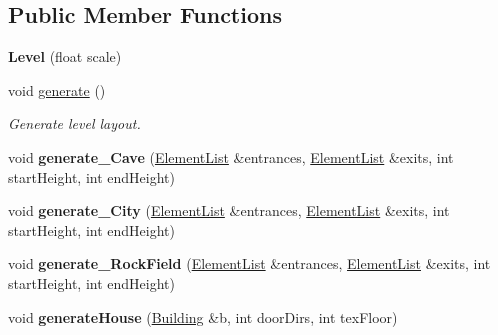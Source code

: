 \subsection*{\-Public \-Member \-Functions}
\begin{DoxyCompactItemize}
\item 
\hypertarget{classLevel_ae153822123767559c1951df8e112ee2b}{
{\bfseries \-Level} (float scale)}
\label{d2/d9d/classLevel_ae153822123767559c1951df8e112ee2b}

\item 
\hypertarget{classLevel_a1c6d2997eb3741c8b22f4a4623eabdc3}{
void \hyperlink{classLevel_a1c6d2997eb3741c8b22f4a4623eabdc3}{generate} ()}
\label{d2/d9d/classLevel_a1c6d2997eb3741c8b22f4a4623eabdc3}

\begin{DoxyCompactList}\small\item\em \-Generate level layout. \end{DoxyCompactList}\item 
\hypertarget{classLevel_a89a0d88fbfc4f215946b5b3645545859}{
void {\bfseries generate\-\_\-\-Cave} (\hyperlink{classLevel_acfda2c619231d9623457ebb133ef6b84}{\-Element\-List} \&entrances, \hyperlink{classLevel_acfda2c619231d9623457ebb133ef6b84}{\-Element\-List} \&exits, int start\-Height, int end\-Height)}
\label{d2/d9d/classLevel_a89a0d88fbfc4f215946b5b3645545859}

\item 
\hypertarget{classLevel_a14c6378b57f1966fe8a090eebf08d161}{
void {\bfseries generate\-\_\-\-City} (\hyperlink{classLevel_acfda2c619231d9623457ebb133ef6b84}{\-Element\-List} \&entrances, \hyperlink{classLevel_acfda2c619231d9623457ebb133ef6b84}{\-Element\-List} \&exits, int start\-Height, int end\-Height)}
\label{d2/d9d/classLevel_a14c6378b57f1966fe8a090eebf08d161}

\item 
\hypertarget{classLevel_a18690f87f99b79af7faadeb90137324a}{
void {\bfseries generate\-\_\-\-Rock\-Field} (\hyperlink{classLevel_acfda2c619231d9623457ebb133ef6b84}{\-Element\-List} \&entrances, \hyperlink{classLevel_acfda2c619231d9623457ebb133ef6b84}{\-Element\-List} \&exits, int start\-Height, int end\-Height)}
\label{d2/d9d/classLevel_a18690f87f99b79af7faadeb90137324a}

\item 
\hypertarget{classLevel_a392ed200d9ebaacebba7c1196924a4d2}{
void {\bfseries generate\-House} (\hyperlink{structLevel_1_1Building}{\-Building} \&b, int door\-Dirs, int tex\-Floor)}
\label{d2/d9d/classLevel_a392ed200d9ebaacebba7c1196924a4d2}


\end{DoxyCompactItemize}
